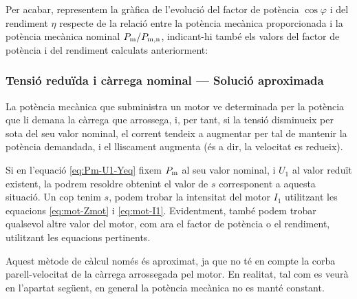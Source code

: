 \begin{exemple}
	Per acabar, representem  la gràfica de l'evolució del factor de potència $\cos\varphi$ i del rendiment $\eta$  respecte de la relació entre la potència mecànica proporcionada i la potència mecànica nominal $P_\mathrm{m}/P_\mathrm{m,n}$, indicant-hi també els valors del factor de potència i del rendiment calculats anteriorment:
	\begin{center}
		
	\end{center}

\end{exemple}
	
\subsubsection{Tensió reduïda i càrrega nominal --- Solució aproximada}

La potència mecànica que subministra un motor ve determinada per la potència que li demana la càrrega que arrossega, i, per tant, si la tensió disminueix per sota del seu valor nominal, el corrent tendeix a augmentar per tal de mantenir la potència demandada, i el lliscament augmenta (és a dir, la velocitat es redueix).

Si en l'equació \eqref{eq:Pm-U1-Yeq} fixem $P_\mathrm{m}$ al seu valor nominal, i $U_1$ al valor reduït existent, la podrem resoldre obtenint el valor de $s$ corresponent  a aquesta situació. Un cop tenim $s$, podem trobar la intensitat del motor $I_1$ utilitzant les equacions \eqref{eq:mot-Zmot} i \eqref{eq:mot-I1}. Evidentment, també podem trobar qualsevol altre valor del motor, com  ara el factor de potència o el rendiment, utilitzant les equacions pertinents.

Aquest mètode de càlcul només és aproximat, ja que no té en compte la corba parell-velocitat de la càrrega arrossegada pel motor. En realitat, tal com es veurà en l'apartat següent, en general la potència mecànica no es manté constant.

